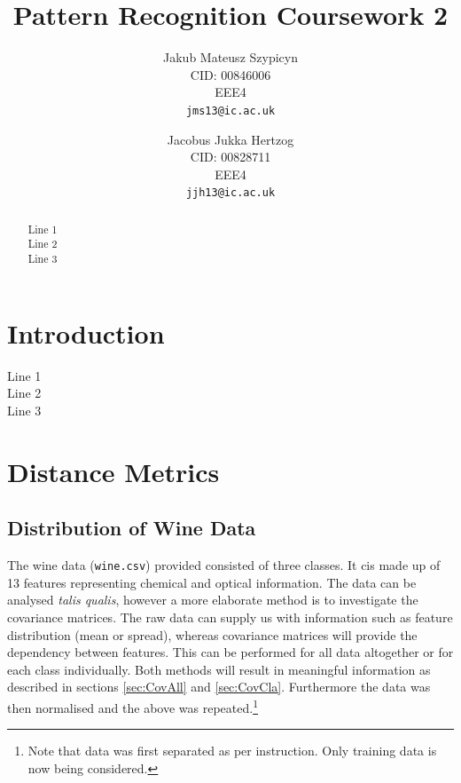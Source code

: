\documentclass[10pt,twocolumn,letterpaper]{article}
\begin{document}
\title{Pattern Recognition Coursework 2}

\author{Jakub Mateusz Szypicyn\\
CID: 00846006\\
EEE4\\
{\tt\small jms13@ic.ac.uk}
\and
Jacobus Jukka Hertzog\\
CID: 00828711\\
EEE4\\
{\tt\small jjh13@ic.ac.uk}
}

\maketitle

\begin{abstract}
Line 1\\

Line 2\\

Line 3\\
\end{abstract}

\section{Introduction}
Line 1\\

Line 2\\

Line 3\\
\section{Distance Metrics}
\subsection{Distribution of Wine Data}

The wine data ({\tt\small wine.csv}) provided consisted of three classes. It cis made up of 13 features representing chemical and optical information. The data can be analysed \textit{talis qualis}, however a more elaborate method is to investigate the covariance matrices. The raw data can supply us with information such as feature distribution (mean or spread), whereas covariance matrices will provide the dependency between features. This can be performed for all data altogether or for each class individually. Both methods will result in meaningful information as described in sections \ref{sec:CovAll} and \ref{sec:CovCla}. Furthermore the data was then normalised and the above was repeated.\footnote{Note that data was first separated as per instruction. Only training data is now being considered.} 
\end{document}
